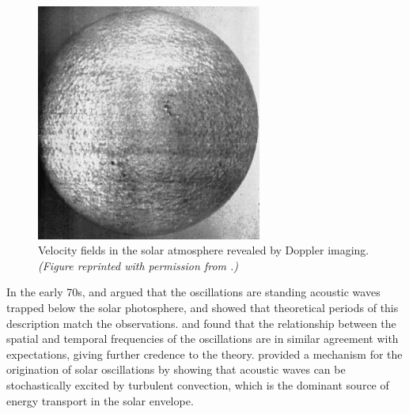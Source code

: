 \begin{figure}[t!]%
    \centering
    \includegraphics[width=0.66\textwidth,%
        trim={0 1.5mm 0 1.5mm}, clip]{pics/solar-velocity-fields2.png}
    \caption[Velocity fields in the solar atmosphere]{Velocity fields in the solar atmosphere revealed by Doppler imaging. %
    \emph{(Figure reprinted with permission from \citealt{1962ApJ...135..474L}.)}
    \label{fig:solar-velocity-fields}}
\end{figure}


In the early 70s, \citet{1970ApJ...162..993U} and \citet{1971ApL.....7..191L} argued that the oscillations are standing acoustic waves trapped below the solar photosphere, and showed that theoretical periods of this description match the observations. 
\citet{1975A&A....44..371D} and \citet{1977ApJ...218..901R} found that the relationship between the spatial and temporal frequencies of the oscillations are in similar agreement with expectations, giving further credence to the theory. 
\citet{1977ApJ...212..243G} provided a mechanism for the origination of solar oscillations by showing that acoustic waves can be stochastically excited by turbulent convection, which is the dominant source of energy transport in the solar envelope. 



